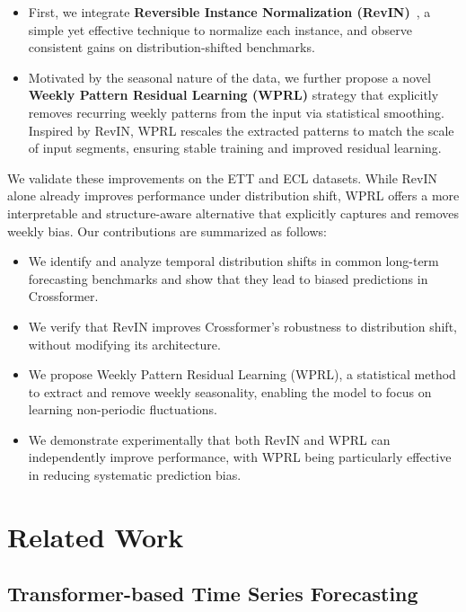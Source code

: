 \documentclass{article}
\begin{document}
\begin{itemize}
    \item First, we integrate \textbf{Reversible Instance Normalization (RevIN)}~\cite{kim2022reversible}, a simple yet effective technique to normalize each instance, and observe consistent gains on distribution-shifted benchmarks.
    \item Motivated by the seasonal nature of the data, we further propose a novel \textbf{Weekly Pattern Residual Learning (WPRL)} strategy that explicitly removes recurring weekly patterns from the input via statistical smoothing. Inspired by RevIN, WPRL rescales the extracted patterns to match the scale of input segments, ensuring stable training and improved residual learning.
\end{itemize}

We validate these improvements on the ETT and ECL datasets. While RevIN alone already improves performance under distribution shift, WPRL offers a more interpretable and structure-aware alternative that explicitly captures and removes weekly bias. Our contributions are summarized as follows:

\begin{itemize}
    \item We identify and analyze temporal distribution shifts in common long-term forecasting benchmarks and show that they lead to biased predictions in Crossformer.
    \item We verify that RevIN improves Crossformer’s robustness to distribution shift, without modifying its architecture.
    \item We propose Weekly Pattern Residual Learning (WPRL), a statistical method to extract and remove weekly seasonality, enabling the model to focus on learning non-periodic fluctuations.
    \item We demonstrate experimentally that both RevIN and WPRL can independently improve performance, with WPRL being particularly effective in reducing systematic prediction bias.
\end{itemize}




\section{Related Work}

\subsection{Transformer-based Time Series Forecasting}
\end{document}
